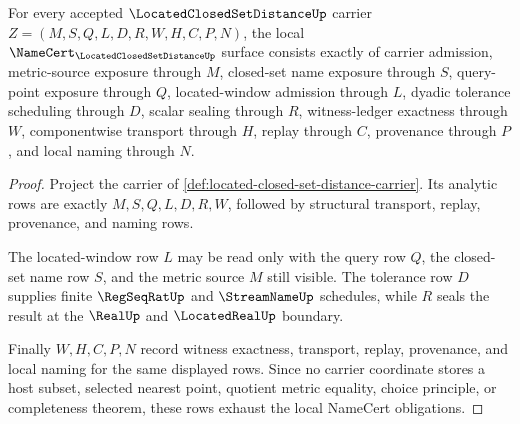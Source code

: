 \begin{theorem}
\label{thm:located-closed-set-distance-namecert-obligations}
For every accepted $\LocatedClosedSetDistanceUp$ carrier $Z=(M,S,Q,L,D,R,W,H,C,P,N)$, the local $\NameCert_{\LocatedClosedSetDistanceUp}$ surface consists exactly of carrier admission, metric-source exposure through $M$, closed-set name exposure through $S$, query-point exposure through $Q$, located-window admission through $L$, dyadic tolerance scheduling through $D$, scalar sealing through $R$, witness-ledger exactness through $W$, componentwise transport through $H$, replay through $C$, provenance through $P$, and local naming through $N$.
\end{theorem}
\begin{proof}
Project the carrier of \autoref{def:located-closed-set-distance-carrier}. Its analytic rows are exactly $M,S,Q,L,D,R,W$, followed by structural transport, replay, provenance, and naming rows.

The located-window row $L$ may be read only with the query row $Q$, the closed-set name row $S$, and the metric source $M$ still visible. The tolerance row $D$ supplies finite $\RegSeqRatUp$ and $\StreamNameUp$ schedules, while $R$ seals the result at the $\RealUp$ and $\LocatedRealUp$ boundary.

Finally $W,H,C,P,N$ record witness exactness, transport, replay, provenance, and local naming for the same displayed rows. Since no carrier coordinate stores a host subset, selected nearest point, quotient metric equality, choice principle, or completeness theorem, these rows exhaust the local NameCert obligations.
\end{proof}

